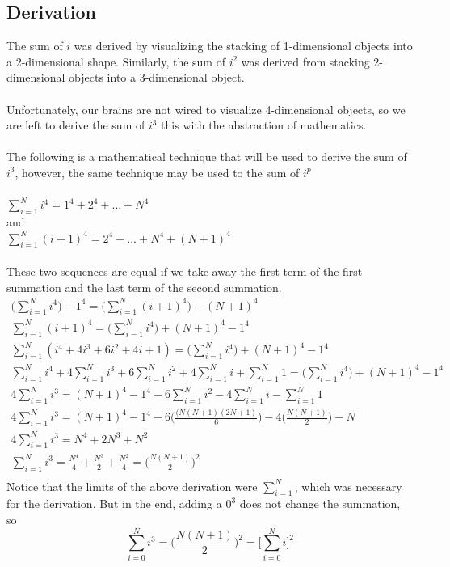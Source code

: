 \subsection{Derivation}
The sum of \(i\) was derived by visualizing the stacking of 1-dimensional objects into a 2-dimensional shape.  Similarly, the sum of \(i^2\) was derived from stacking 2-dimensional objects into a 3-dimensional object. \\
\\
Unfortunately, our brains are not wired to visualize 4-dimensional objects, so we are left to derive the sum of \(i^3\) this with the abstraction of mathematics. \\
\\
The following is a mathematical technique that will be used to derive the sum of \(i^3\), however, the same technique may be used to the sum of \(i^p\)\\
\\
\(\sum\limits_{i=1}^N{i^4} = 1^4 + 2^4 + ... + N^4 \) \\
and \\
\(\sum\limits_{i=1}^N{(i+1)^4} = 2^4 + ... + N^4 + (N+1)^4\) \\
\\
These two sequences are equal if we take away the first term of the first summation and the last term of the second summation. \\
\begin{align*}
\bigg(\sum\limits_{i=1}^N{i^4} \bigg) - 1^4 = \bigg( \sum\limits_{i=1}^N{(i+1)^4} \bigg) -(N+1)^4 \\
\sum\limits_{i=1}^N{(i+1)^4} = \bigg(\sum\limits_{i=1}^N{i^4} \bigg) + (N+1)^4 - 1^4 \\
\sum\limits_{i=1}^N{(i^4 +4i^3 + 6i^2 + 4i +1)} = \bigg(\sum\limits_{i=1}^N{i^4} \bigg) + (N+1)^4 - 1^4 \\
\sum\limits_{i=1}^N{i^4} + 4\sum\limits_{i=1}^N{i^3} + 6\sum\limits_{i=1}^N{i^2} +4\sum\limits_{i=1}^N{i} + \sum\limits_{i=1}^N{1} = \bigg(\sum\limits_{i=1}^N{i^4} \bigg) + (N+1)^4 - 1^4 \\
4\sum\limits_{i=1}^N{i^3} = (N+1)^4 - 1^4  - 6\sum\limits_{i=1}^N{i^2} - 4\sum\limits_{i=1}^N{i} - \sum\limits_{i=1}^N{1} \\
 4\sum\limits_{i=1}^N{i^3} = (N+1)^4 - 1^4  - 6\bigg(\frac{(N(N+1)(2N+1)}{6}\bigg) - 4\bigg(\frac{N(N+1)}{2}\bigg) - N \\
4\sum\limits_{i=1}^N{i^3} = N^4 + 2N^3 + N^2\\
\sum\limits_{i=1}^N{i^3} = \frac{N^4}{4} + \frac{N^3}{2} + \frac{N^2}{4} = \bigg(\frac{N(N+1)}{2}\bigg)^2\\
\end{align*}
Notice that the limits of the above derivation were \( \sum\limits_{i=1}^N \), which was necessary for the derivation.  But in the end, adding a \(0^3\) does not change the summation, so
\[\sum\limits_{i=0}^N{i^3} = \bigg(\frac{N(N+1)}{2}\bigg)^2 = \bigg[ \sum\limits_{i=0}^N{i}\bigg]^2\]

